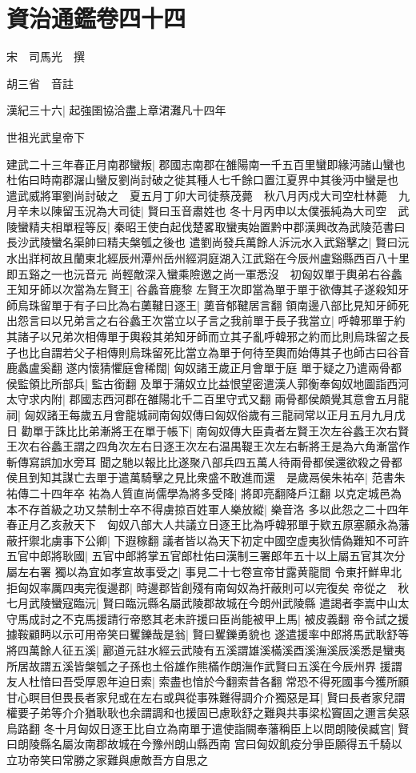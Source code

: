 \chapter{資治通鑑卷四十四}
宋　司馬光　撰

胡三省　音註

漢紀三十六|{
	起強圉協洽盡上章涒灘凡十四年}


世祖光武皇帝下

建武二十三年春正月南郡蠻叛|{
	郡國志南郡在雒陽南一千五百里蠻即緣沔諸山蠻也杜佑曰時南郡潳山蠻反劉尚討破之徙其種人七千餘口置江夏界中其後沔中蠻是也}
遣武威將軍劉尚討破之　夏五月丁卯大司徒蔡茂薨　秋八月丙戍大司空杜林薨　九月辛未以陳留玉況為大司徒|{
	賢曰玉音肅姓也}
冬十月丙申以太僕張純為大司空　武陵蠻精夫相單程等反|{
	秦昭王使白起伐楚畧取蠻夷始置黔中郡漢興改為武陵范書曰長沙武陵蠻名渠帥曰精夫槃瓠之後也}
遣劉尚發兵萬餘人泝沅水入武谿擊之|{
	賢曰沅水出牂柯故且蘭東北經辰州潭州岳州經洞庭湖入江武谿在今辰州盧谿縣西百八十里即五谿之一也沅音元}
尚輕敵深入蠻乘險邀之尚一軍悉沒　初匈奴單于輿弟右谷蠡王知牙師以次當為左賢王|{
	谷蠡音鹿黎}
左賢王次即當為單于單于欲傳其子遂殺知牙師烏珠留單于有子曰比為右薁鞬日逐王|{
	薁音郁鞬居言翻}
領南邊八部比見知牙師死出怨言曰以兄弟言之右谷蠡王次當立以子言之我前單于長子我當立|{
	呼韓邪單于約其諸子以兄弟次相傳單于輿殺其弟知牙師而立其子亂呼韓邪之約而比則烏珠留之長子也比自謂若父子相傳則烏珠留死比當立為單于何待至輿而始傳其子也師古曰谷音鹿蠡盧奚翻}
遂内懷猜懼庭會稀闊|{
	匈奴諸王歲正月會單于庭}
單于疑之乃遣兩骨都侯監領比所部兵|{
	監古銜翻}
及單于蒲奴立比益恨望密遣漢人郭衡奉匈奴地圖詣西河太守求内附|{
	郡國志西河郡在雒陽北千二百里守式又翻}
兩骨都侯頗覺其意會五月龍祠|{
	匈奴諸王每歲五月會龍城祠南匈奴傳曰匈奴俗歲有三龍祠常以正月五月九月戊日}
勸單于誅比比弟漸將王在單于帳下|{
	南匈奴傳大臣貴者左賢王次左谷蠡王次右賢王次右谷蠡王謂之四角次左右日逐王次左右温禺鞮王次左右斬將王是為六角漸當作斬傳寫誤加水旁耳}
聞之馳以報比比遂聚八部兵四五萬人待兩骨都侯還欲殺之骨都侯且到知其謀亡去單于遣萬騎擊之見比衆盛不敢進而還　是歲鬲侯朱祐卒|{
	范書朱祐傳二十四年卒}
祐為人質直尚儒學為將多受降|{
	將即亮翻降戶江翻}
以克定城邑為本不存首級之功又禁制士卒不得虜掠百姓軍人樂放縱|{
	樂音洛}
多以此怨之二十四年春正月乙亥赦天下　匈奴八部大人共議立日逐王比為呼韓邪單于欵五原塞願永為藩蔽扞禦北虜事下公卿|{
	下遐稼翻}
議者皆以為天下初定中國空虚夷狄情偽難知不可許五官中郎將耿國|{
	五官中郎將掌五官郎杜佑曰漢制三署郎年五十以上屬五官其次分屬左右署}
獨以為宜如孝宣故事受之|{
	事見二十七卷宣帝甘露黄龍間}
令東扞鮮卑北拒匈奴率厲四夷完復邊郡|{
	時邊郡皆創殘有南匈奴為扞蔽則可以完復矣}
帝從之　秋七月武陵蠻寇臨沅|{
	賢曰臨沅縣名屬武陵郡故城在今朗州武陵縣}
遣謁者李嵩中山太守馬成討之不克馬援請行帝愍其老未許援曰臣尚能被甲上馬|{
	被皮義翻}
帝令試之援據鞍顧眄以示可用帝笑曰矍鑠哉是翁|{
	賢曰矍鑠勇貌也}
遂遣援率中郎將馬武耿舒等將四萬餘人征五溪|{
	酈道元註水經云武陵有五溪謂雄溪樠溪酉溪潕溪辰溪悉是蠻夷所居故謂五溪皆槃瓠之子孫也土俗雄作熊樠作朗潕作武賢曰五溪在今辰州界}
援謂友人杜愔曰吾受厚恩年迫日索|{
	索盡也愔於今翻索昔各翻}
常恐不得死國事今獲所願甘心瞑目但畏長者家兒或在左右或與從事殊難得調介介獨惡是耳|{
	賢曰長者家兒謂權要子弟等介介猶耿耿也余謂調和也援固已慮耿舒之難與共事梁松竇固之邇言矣惡烏路翻}
冬十月匈奴日逐王比自立為南單于遣使詣闕奉藩稱臣上以問朗陵侯臧宫|{
	賢曰朗陵縣名屬汝南郡故城在今豫州朗山縣西南}
宫曰匈奴飢疫分爭臣願得五千騎以立功帝笑曰常勝之家難與慮敵吾方自思之

